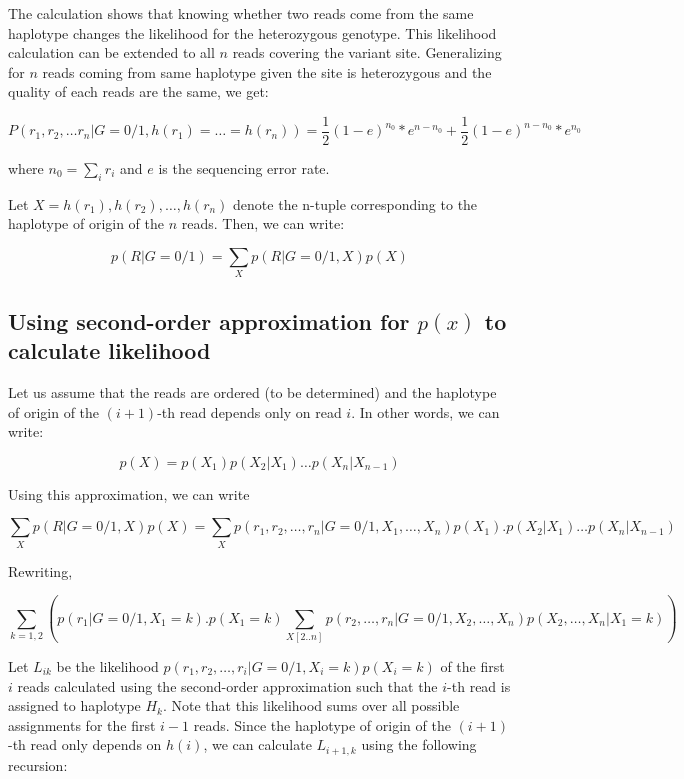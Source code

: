 \documentclass[9pt]{osa-supplemental-document}
\begin{document}
The calculation shows that knowing whether two reads come from the same haplotype changes the likelihood for the heterozygous genotype. This likelihood calculation can be extended to all $n$ reads covering the variant site. Generalizing for $n$ reads coming from same haplotype given the site is heterozygous and the quality of each reads are the same, we get:

\begin{equation*}
P(r_1,r_2,\ldots r_n | G=0/1, h(r_1)=\ldots = h(r_n)) = \frac{1}{2}(1-e)^{n_0}*e^{n-n_0}   + \frac{1}{2}(1-e)^{n-n_0}*e^{n_0}
\end{equation*}

where $n_0 = \sum_i r_i$ and $e$ is the sequencing error rate.

Let $X = h(r_1),h(r_2),\ldots,h(r_n)$ denote the n-tuple corresponding to the haplotype of origin of the $n$ reads. Then, we can write: 

\[ 
p(R|G=0/1) = \sum_X p(R|G=0/1,X)p(X) 
\]


\subsection{Using second-order approximation for $p(x)$ to calculate likelihood}
Let us assume that the reads are ordered (to be determined) and the haplotype of origin of the $(i+1)$-th read depends only on read $i$. In other words, we can write: 

\[ p(X) = p(X_1) p(X_2|X_1) \ldots p(X_n|X_{n-1}) \]

Using this approximation, we can write

\[ 
 \sum_X p(R|G=0/1,X)p(X) = \sum_X p(r_1,r_2,\ldots,r_n|G=0/1,X_1,\ldots,X_n)p(X_1).p(X_2|X_1)\ldots p(X_n|X_{n-1})
\]

Rewriting,

\[
 \sum_{k=1,2} \left( p(r_1|G=0/1,X_1=k).p(X_1=k) \sum_{X[2..n]} p(r_2,\ldots,r_n|G=0/1,X_2,\ldots,X_n)p(X_2,\ldots,X_n|X_1=k) \right)
\]


Let $L_{ik}$ be the likelihood $p(r_1,r_2,\ldots,r_i|G=0/1,X_{i} = k)p(X_i=k)$ of the first $i$ reads calculated using the second-order approximation such that the $i$-th read is assigned to haplotype $H_k$. Note that this likelihood sums over all possible assignments for the first $i-1$ reads. Since the haplotype of origin of the $(i+1)$-th read only depends on $h(i)$, we can calculate $L_{i+1,k}$ using the following recursion: 
\end{document}
